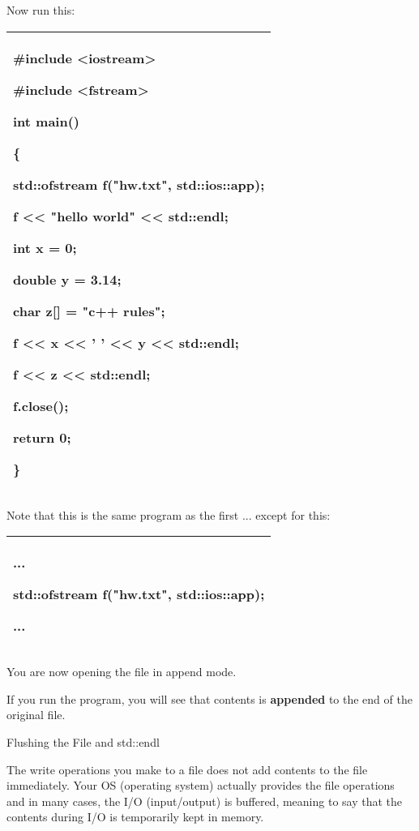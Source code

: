 \documentclass[
]{article}
\begin{document}
Now run this:

\begin{longtable}[]{@{}l@{}}
\toprule
\endhead
\begin{minipage}[t]{0.97\columnwidth}\raggedright
\#include \textless iostream\textgreater{}

\#include \textless fstream\textgreater{}

int main()

\{

std::\textbf{ofstream} f("hw.txt", std::ios::\textbf{app});

f \textless\textless{} "hello world" \textless\textless{} std::endl;

int x = 0;

double y = 3.14;

char z{[}{]} = "c++ rules";

f \textless\textless{} x \textless\textless{} ' ' \textless\textless{} y
\textless\textless{} std::endl;

f \textless\textless{} z \textless\textless{} std::endl;

f.close();

return 0;

\}\strut
\end{minipage}\tabularnewline
\bottomrule
\end{longtable}

Note that this is the same program as the first ... except for this:

\begin{longtable}[]{@{}l@{}}
\toprule
\endhead
\begin{minipage}[t]{0.97\columnwidth}\raggedright
...

std::ofstream f("hw.txt", std::ios::\textbf{app});

...\strut
\end{minipage}\tabularnewline
\bottomrule
\end{longtable}

You are now opening the file in append mode.

If you run the program, you will see that contents is \textbf{appended}
to the end of the original file.

Flushing the File and std::endl

The write operations you make to a file does not add contents to the
file immediately. Your OS (operating system) actually provides the file
operations and in many cases, the I/O (input/output) is buffered,
meaning to say that the contents during I/O is temporarily kept in
memory.
\end{document}
